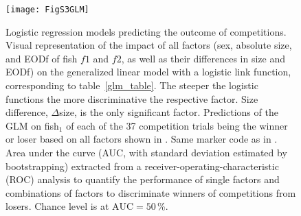 \begin{figure}[!h]
  \centerline{\texttt{[image: FigS3GLM]}}
  \caption{\label{glm} Logistic regression models predicting the outcome of competitions.  Visual representation of the impact of all factors (sex, absolute size, and EODf of fish $f1$ and $f2$, as well as their differences in size and EODf) on the generalized linear model with a logistic link function, corresponding to table~\ref{glm_table}. The steeper the logistic functions the more discriminative the respective factor. Size difference, $\Delta$size, is the only significant factor.  Predictions of the GLM on fish$_1$ of each of the 37 competition trials being the winner or loser based on all factors shown in . Same marker code as in .  Area under the curve (AUC, with standard deviation estimated by bootstrapping) extracted from a receiver-operating-characteristic (ROC) analysis to quantify the performance of single factors and combinations of factors to discriminate winners of competitions from losers. Chance level is at $\text{AUC} = 50$\,\%.}
\end{figure}

\renewcommand\thefigure{\thechapter.\arabic{figure}}
\setcounter{figure}{0}   
